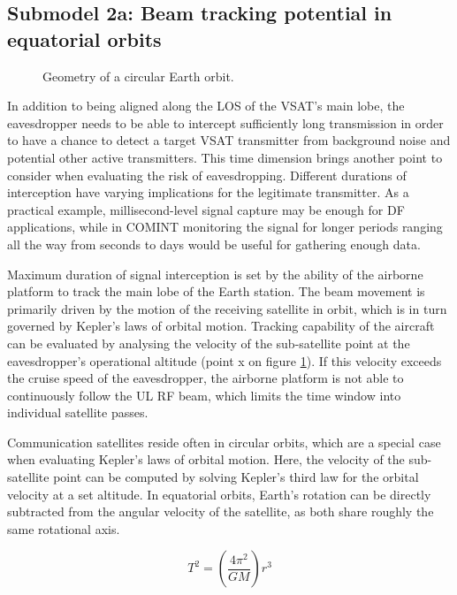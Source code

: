 \documentclass[english, 12pt, a4paper, elec, utf8, a-1b, online]{aaltothesis}
\begin{document}
\subsection{Submodel 2a: Beam tracking potential in equatorial orbits} \label{ch-results-submodel-2a-tracking-equatorial}

\begin{figure}[h]
  \centering
  
  \caption{Geometry of a circular Earth orbit.}
  \label{fig-orbit-geometry}
\end{figure}

In addition to being aligned along the LOS of the VSAT's main lobe, the eavesdropper needs to be able to intercept sufficiently long transmission in order to have a chance to detect a target VSAT transmitter from background noise and potential other active transmitters.
This time dimension brings another point to consider when evaluating the risk of eavesdropping.
Different durations of interception have varying implications for the legitimate transmitter.
As a practical example, millisecond-level signal capture may be enough for DF applications, while in COMINT monitoring the signal for longer periods ranging all the way from seconds to days would be useful for gathering enough data. %

Maximum duration of signal interception is set by the ability of the airborne platform to track the main lobe of the Earth station.
The beam movement is primarily driven by the motion of the receiving satellite in orbit, which is in turn governed by Kepler's laws of orbital motion.
Tracking capability of the aircraft can be evaluated by analysing the velocity of the sub-satellite point at the eavesdropper's operational altitude (point x on figure \ref{fig-orbit-geometry}). %
If this velocity exceeds the cruise speed of the eavesdropper, the airborne platform is not able to continuously follow the UL RF beam, which limits the time window into individual satellite passes.

Communication satellites reside often in circular orbits, which are a special case when evaluating Kepler's laws of orbital motion.
Here, the velocity of the sub-satellite point can be computed by solving Kepler's third law for the orbital velocity at a set altitude.
In equatorial orbits, Earth's rotation can be directly subtracted from the angular velocity of the satellite, as both share roughly the same rotational axis.

\begin{equation} \label{eq-kepler-3}
  T^2 = (\frac{4\pi^2}{GM})r^3
\end{equation}
\end{document}

